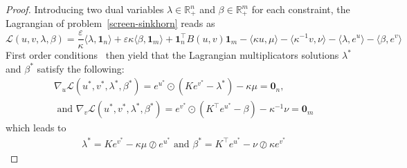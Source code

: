 \documentclass{article}
\newcommand{\inr}[1]{\langle #1 \rangle}
\newcommand{\R}{{\mathbb{R}}}
\begin{document}
\begin{proof}

Introducing two dual variables $\lambda \in \R^n_{+}$ and $\beta \in \R^m_{+}$ for each constraint, the Lagrangian of problem~\eqref{screen-sinkhorn} reads as 
\begin{equation*}
  \mathscr{L}(u,v, \lambda, \beta) = \frac \varepsilon\kappa\inr{\lambda, \mathbf{1}_n} + \varepsilon\kappa\inr{\beta, \mathbf{1}_m} + \mathbf{1}_n^\top B(u,v) \mathbf{1}_m - \inr{\kappa u, \mu} - \inr{\kappa^{-1}v, \nu} -\inr{\lambda,e^{u}} - \inr{\beta,e^{v}}
\end{equation*}
First order conditions~\citep{boyd2004} then yield that the Lagrangian multiplicators solutions $\lambda^{*}$ and $\beta^{*}$ satisfy the following:
\begin{align*}
  &\nabla_u\mathscr{L}(u^{*},v^{*}, \lambda^{*}, \beta^{*})=  e^{u^{*}} \odot(Ke^{v^{*}} - \lambda^{*}) - \kappa\mu = \mathbf 0_n,\\
  & \text{ and } \nabla_v\mathscr{L}(u^{*},v^{*}, \lambda^{*}, \beta^{*})=  e^{v^{*}} \odot(K^\top e^{u^{*}} - \beta) - \kappa^{-1} \nu = \mathbf 0_m
\end{align*}
which leads to 
\begin{align*}
  &\lambda^{*} = K e^{v^{*}} - \kappa\mu \oslash e^{u^{*}} \text{ and }
  \beta^{*} = K^\top e^{u^{*}} - \nu \oslash \kappa e^{v^{*}}
\end{align*}


\end{proof}
\end{document}
